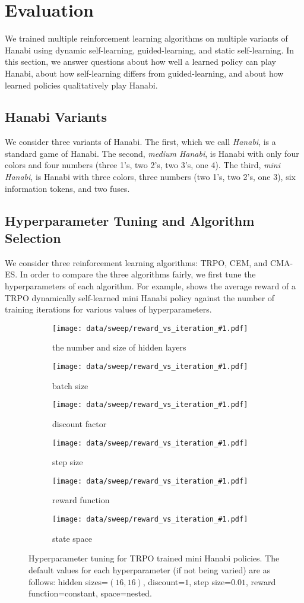 \section{Evaluation}\label{sec:eval}

We trained multiple reinforcement learning algorithms on multiple variants of
Hanabi using dynamic self-learning, guided-learning, and static self-learning.
In this section, we answer questions about how well a learned policy can play
Hanabi, about how self-learning differs from guided-learning, and about how
learned policies qualitatively play Hanabi.

\subsection{Hanabi Variants}
We consider three variants of Hanabi. The first, which we call \emph{Hanabi},
is a standard game of Hanabi. The second, \emph{medium Hanabi}, is Hanabi with
only four colors and four numbers (three 1's, two 2's, two 3's, one 4). The
third, \emph{mini Hanabi}, is Hanabi with three colors, three numbers (two 1's,
two 2's, one 3), six information tokens, and two fuses.

\subsection{Hyperparameter Tuning and Algorithm Selection}
We consider three reinforcement learning algorithms: TRPO, CEM, and CMA-ES. In
order to compare the three algorithms fairly, we first tune the hyperparameters
of each algorithm. For example,  shows the average reward
of a TRPO dynamically self-learned mini Hanabi policy against the number of
training iterations for various values of hyperparameters.

\begin{figure}[ht]
  \newcommand{\hyperparamsubfig}[3]{%
    \begin{subfigure}[t]{0.32\textwidth}
      \centering
      \texttt{[image: data/sweep/reward\_vs\_iteration\_\#1.pdf]}
      \caption{#2}\label{fig:#3}
    \end{subfigure}
  }

  \centering

  \hyperparamsubfig{hidden_sizes}{the number and size of hidden layers}{}
  \hyperparamsubfig{batch_size}{batch size}{}
  \hyperparamsubfig{discount}{discount factor}{}

  \hyperparamsubfig{step_size}{step size}{}
  \hyperparamsubfig{reward}{reward function}{}
  \hyperparamsubfig{space}{state space}{}

  \caption{
    Hyperparameter tuning for TRPO trained mini Hanabi policies. The default
    values for each hyperparameter (if not being varied) are as follows: hidden
    sizes=$(16, 16)$, discount=$1$, step size=$0.01$, reward function=constant,
    space=nested.
  }\label{fig:trpo-tuning}
\end{figure}


